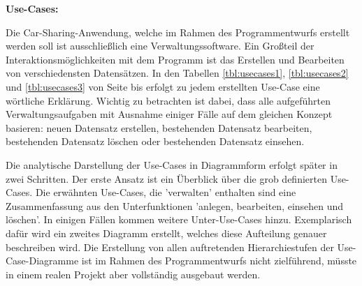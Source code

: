 \newpage

\textbf{Use-Cases:}


Die Car-Sharing-Anwendung, welche im Rahmen des Programmentwurfs erstellt werden soll ist ausschließlich eine Verwaltungssoftware. Ein Großteil der Interaktionsmöglichkeiten mit dem Programm ist das Erstellen und Bearbeiten von verschiedensten Datensätzen. 
In den Tabellen \ref{tbl:usecases1}, \ref{tbl:usecases2} und \ref{tbl:usecases3} von Seite \pageref{tbl:usecases1} bis \pageref{tbl:usecases3} erfolgt zu jedem erstellten Use-Case eine wörtliche Erklärung. Wichtig zu betrachten ist dabei, dass alle aufgeführten Verwaltungsaufgaben mit Ausnahme einiger Fälle auf dem gleichen Konzept basieren: neuen Datensatz erstellen, bestehenden Datensatz bearbeiten, bestehenden Datensatz löschen oder bestehenden Datensatz einsehen.

Die analytische Darstellung der Use-Cases in Diagrammform erfolgt später in zwei Schritten. Der erste Ansatz ist ein  Überblick über die grob definierten Use-Cases. Die erwähnten Use-Cases, die 'verwalten' enthalten sind eine Zusammenfassung aus den Unterfunktionen 'anlegen, bearbeiten, einsehen und löschen'. In einigen Fällen kommen weitere Unter-Use-Cases hinzu. Exemplarisch dafür wird ein zweites Diagramm erstellt, welches diese Aufteilung genauer beschreiben wird. Die Erstellung von allen auftretenden Hierarchiestufen der Use-Case-Diagramme ist im Rahmen des Programmentwurfs nicht zielführend, müsste in einem realen Projekt aber vollständig ausgebaut werden. 

\newpage

